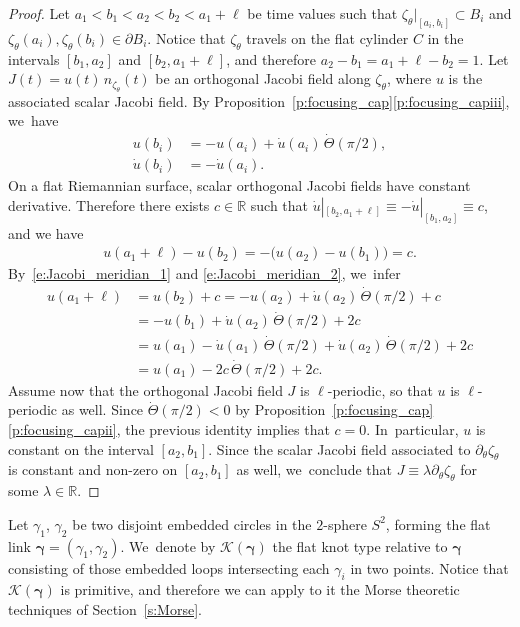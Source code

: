 \documentclass[11pt]{article}
\let\bm\boldsymbol
\newcommand{\R}{\mathbb{R}}
\newcommand{\KK}{\mathcal{K}}
\theoremstyle{plain}
\theoremstyle{definition}
\begin{document}
\begin{proof}
Let $a_1<b_1<a_2<b_2<a_1+\ell$ be time values such that $\zeta_\theta|_{[a_i,b_i]}\subset B_i$ and $\zeta_\theta(a_i),\zeta_\theta(b_i)\in\partial B_i$. Notice that $\zeta_\theta$ travels on the flat cylinder $C$ in the intervals $[b_1,a_2]$ and $[b_2,a_1+\ell]$, and therefore $a_2-b_1=a_1+\ell-b_2=1$. Let $J(t)=u(t)\,n_{\zeta_\theta}(t)$ be an orthogonal Jacobi field along $\zeta_\theta$, where $u$ is the associated scalar Jacobi field.
By Proposition~\ref{p:focusing_cap}\eqref{p:focusing_capiii}, we~have
\begin{equation}
\label{e:Jacobi_meridian_1}
\begin{split}
u(b_i) & = -u(a_i)+\dot u(a_i)\,\dot\Theta(\pi/2),
\\
\dot u(b_i) & = -\dot u(a_i).
\end{split}
\end{equation}
On a flat Riemannian surface, scalar orthogonal Jacobi fields have constant derivative. Therefore there exists $c\in\R$ such that
$\dot u|_{[b_2,a_1+\ell]}\equiv - \dot u|_{[b_1,a_2]} \equiv c$,
and we have
\begin{align}
\label{e:Jacobi_meridian_2}
u(a_1+\ell)-u(b_2)
=
-\big(u(a_2)-u(b_1)\big)
=
c.
\end{align}
By~\eqref{e:Jacobi_meridian_1} and \eqref{e:Jacobi_meridian_2}, we~infer
\begin{align*}
u(a_1+\ell)
& = u(b_2)+c
= -u(a_2) + \dot u(a_2)\,\dot\Theta(\pi/2) +c \\
& = -u(b_1) + \dot u(a_2)\,\dot\Theta(\pi/2) + 2c \\
& = u(a_1) - \dot u(a_1)\,\dot\Theta(\pi/2) + \dot u(a_2)\,\dot\Theta(\pi/2) + 2c\\
& = u(a_1) -2c\,\dot\Theta(\pi/2) + 2c.
\end{align*}
Assume now that the orthogonal Jacobi field $J$ is $\ell$-periodic, so that $u$ is $\ell$-periodic as well. Since $\dot\Theta(\pi/2)<0$ by Proposition~\ref{p:focusing_cap}\eqref{p:focusing_capii}, the previous identity implies that $c=0$. In~particular, $u$ is constant on the interval $[a_2,b_1]$. Since the scalar Jacobi field associated to $\partial_\theta\zeta_\theta$ is constant and non-zero on $[a_2,b_1]$ as well, we~conclude that $J\equiv\lambda \partial_\theta\zeta_\theta$ for some $\lambda\in\R$.
\end{proof}

Let $\gamma_1$, $\gamma_2$ be two disjoint embedded circles in the $2$-sphere $S^2$, forming the flat link $\bm\gamma=(\gamma_1,\gamma_2)$. We~denote by $\KK(\bm\gamma)$ the flat knot type relative to $\bm\gamma$ consisting of those embedded loops intersecting each $\gamma_i$ in two points. Notice that $\KK(\bm\gamma)$ is primitive, and therefore we can apply to it the Morse theoretic techniques of Section~\ref{s:Morse}.
\end{document}

